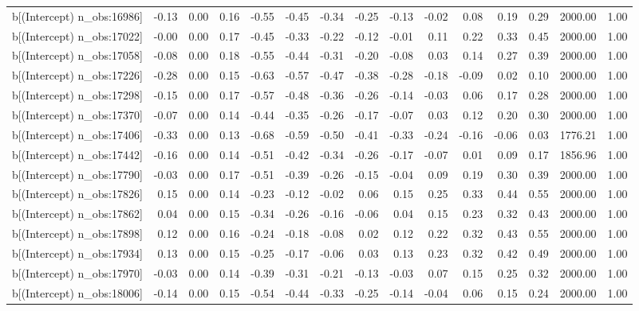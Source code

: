 \begin{table}[ht]
\begin{tabular}{rrrrrrrrrrrrrrr}
  b[(Intercept) n\_obs:16986] & -0.13 & 0.00 & 0.16 & -0.55 & -0.45 & -0.34 & -0.25 & -0.13 & -0.02 & 0.08 & 0.19 & 0.29 & 2000.00 & 1.00 \\ 
  b[(Intercept) n\_obs:17022] & -0.00 & 0.00 & 0.17 & -0.45 & -0.33 & -0.22 & -0.12 & -0.01 & 0.11 & 0.22 & 0.33 & 0.45 & 2000.00 & 1.00 \\ 
  b[(Intercept) n\_obs:17058] & -0.08 & 0.00 & 0.18 & -0.55 & -0.44 & -0.31 & -0.20 & -0.08 & 0.03 & 0.14 & 0.27 & 0.39 & 2000.00 & 1.00 \\ 
  b[(Intercept) n\_obs:17226] & -0.28 & 0.00 & 0.15 & -0.63 & -0.57 & -0.47 & -0.38 & -0.28 & -0.18 & -0.09 & 0.02 & 0.10 & 2000.00 & 1.00 \\ 
  b[(Intercept) n\_obs:17298] & -0.15 & 0.00 & 0.17 & -0.57 & -0.48 & -0.36 & -0.26 & -0.14 & -0.03 & 0.06 & 0.17 & 0.28 & 2000.00 & 1.00 \\ 
  b[(Intercept) n\_obs:17370] & -0.07 & 0.00 & 0.14 & -0.44 & -0.35 & -0.26 & -0.17 & -0.07 & 0.03 & 0.12 & 0.20 & 0.30 & 2000.00 & 1.00 \\ 
  b[(Intercept) n\_obs:17406] & -0.33 & 0.00 & 0.13 & -0.68 & -0.59 & -0.50 & -0.41 & -0.33 & -0.24 & -0.16 & -0.06 & 0.03 & 1776.21 & 1.00 \\ 
  b[(Intercept) n\_obs:17442] & -0.16 & 0.00 & 0.14 & -0.51 & -0.42 & -0.34 & -0.26 & -0.17 & -0.07 & 0.01 & 0.09 & 0.17 & 1856.96 & 1.00 \\ 
  b[(Intercept) n\_obs:17790] & -0.03 & 0.00 & 0.17 & -0.51 & -0.39 & -0.26 & -0.15 & -0.04 & 0.09 & 0.19 & 0.30 & 0.39 & 2000.00 & 1.00 \\ 
  b[(Intercept) n\_obs:17826] & 0.15 & 0.00 & 0.14 & -0.23 & -0.12 & -0.02 & 0.06 & 0.15 & 0.25 & 0.33 & 0.44 & 0.55 & 2000.00 & 1.00 \\ 
  b[(Intercept) n\_obs:17862] & 0.04 & 0.00 & 0.15 & -0.34 & -0.26 & -0.16 & -0.06 & 0.04 & 0.15 & 0.23 & 0.32 & 0.43 & 2000.00 & 1.00 \\ 
  b[(Intercept) n\_obs:17898] & 0.12 & 0.00 & 0.16 & -0.24 & -0.18 & -0.08 & 0.02 & 0.12 & 0.22 & 0.32 & 0.43 & 0.55 & 2000.00 & 1.00 \\ 
  b[(Intercept) n\_obs:17934] & 0.13 & 0.00 & 0.15 & -0.25 & -0.17 & -0.06 & 0.03 & 0.13 & 0.23 & 0.32 & 0.42 & 0.49 & 2000.00 & 1.00 \\ 
  b[(Intercept) n\_obs:17970] & -0.03 & 0.00 & 0.14 & -0.39 & -0.31 & -0.21 & -0.13 & -0.03 & 0.07 & 0.15 & 0.25 & 0.32 & 2000.00 & 1.00 \\ 
  b[(Intercept) n\_obs:18006] & -0.14 & 0.00 & 0.15 & -0.54 & -0.44 & -0.33 & -0.25 & -0.14 & -0.04 & 0.06 & 0.15 & 0.24 & 2000.00 & 1.00 \\ 

\end{tabular}
\end{table}
